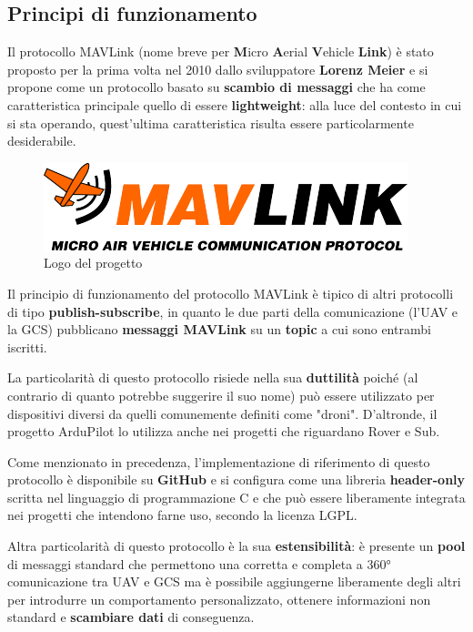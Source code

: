 \documentclass[a4paper, 12pt, oneside]{article}
\begin{document}
\subsection{Principi di funzionamento}
Il protocollo MAVLink (nome breve per \textbf{M}icro \textbf{A}erial \textbf{V}ehicle \textbf{Link}) è stato proposto per la prima volta nel 2010 dallo sviluppatore \textbf{Lorenz Meier} \cite{mavlink-first-commit} e si propone come un protocollo basato su \textbf{scambio di messaggi} che ha come caratteristica principale quello di essere \textbf{lightweight}: alla luce del contesto in cui si sta operando, quest'ultima caratteristica risulta essere particolarmente desiderabile.

\begin{figure}
    \includegraphics[width=0.9\linewidth]{images/logo_mavlink_small.png}
    \caption{Logo del progetto} 
\end{figure}

Il principio di funzionamento del protocollo MAVLink è tipico di altri protocolli di tipo \textbf{publish-subscribe}, in quanto le due parti della comunicazione (l'UAV e la GCS) pubblicano \textbf{messaggi MAVLink} su un \textbf{topic} a cui sono entrambi iscritti. 

La particolarità di questo protocollo risiede nella sua \textbf{duttilità} poiché (al contrario di quanto potrebbe suggerire il suo nome) può essere utilizzato per dispositivi diversi da quelli comunemente definiti come "droni". D'altronde, il progetto ArduPilot lo utilizza anche nei progetti che riguardano Rover e Sub.

Come menzionato in precedenza, l'implementazione di riferimento di questo protocollo è disponibile su \textbf{GitHub} e si configura come una libreria \textbf{header-only} scritta nel linguaggio di programmazione C e che può essere liberamente integrata nei progetti che intendono farne uso, secondo la licenza LGPL. \cite{mavlink-c-implementation}

Altra particolarità di questo protocollo è la sua \textbf{estensibilità}: è presente un \textbf{pool} di messaggi standard che permettono una corretta e completa a 360° comunicazione tra UAV e GCS ma è possibile aggiungerne liberamente degli altri per introdurre un comportamento personalizzato, ottenere informazioni non standard e \textbf{scambiare dati} di conseguenza. 
\end{document}

